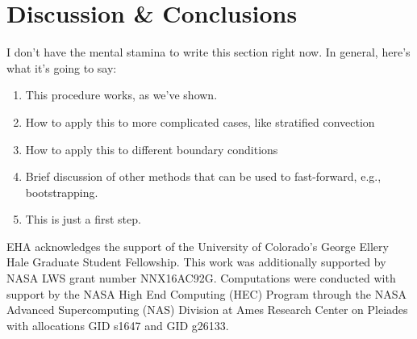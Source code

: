 \documentclass[aps, pre, onecolumn, nofootinbib, notitlepage, groupedaddress, amsfonts, amssymb, amsmath, longbibliography]{revtex4-1}
\begin{document}
\section{Discussion \& Conclusions}
\label{sec:results}
I don't have the mental stamina to write this section right now.  In general, here's what it's going to say:
\begin{enumerate}
\item This procedure works, as we've shown.
\item How to apply this to more complicated cases, like stratified convection
\item How to apply this to different boundary conditions
\item Brief discussion of other methods that can be used to fast-forward, e.g., bootstrapping.
\item This is just a first step.
\end{enumerate}




\begin{acknowledgments}
EHA acknowledges the support of the University of Colorado's George 
Ellery Hale Graduate Student Fellowship.
This work was additionally supported by  NASA LWS grant number NNX16AC92G.  
Computations were conducted 
with support by the NASA High End Computing (HEC) Program through the NASA 
Advanced Supercomputing (NAS) Division at Ames Research Center on Pleiades
with allocations GID s1647 and GID g26133.
\end{acknowledgments}


\appendix
\end{document}
